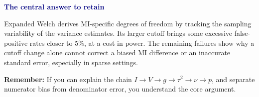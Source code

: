 \documentclass[11pt,a4paper]{article}
\newcommand{\subhead}[1]{\par\medskip\textbf{\textcolor{navy}{#1}}\par\smallskip}
\newcommand{\takeaway}[1]{\par\medskip\noindent\colorbox{pale}{\parbox{\dimexpr\linewidth-2\fboxsep\relax}{\textbf{Remember:} #1}}\par}
\newcommand{\source}[1]{\par\smallskip{\footnotesize\textcolor{navy}{Thesis reference: #1.}}}
\begin{document}
\subhead{The central answer to retain}
Expanded Welch derives MI-specific degrees of freedom by tracking the sampling variability of the variance estimates. Its larger cutoff brings some excessive false-positive rates closer to 5\%, at a cost in power. The remaining failures show why a cutoff change alone cannot correct a biased MI difference or an inaccurate standard error, especially in sparse settings.

\takeaway{If you can explain the chain \(I\rightarrow V\rightarrow g\rightarrow\tau^2\rightarrow\nu\rightarrow p\), and separate numerator bias from denominator error, you understand the core argument.}
\source{Sections 6.4--6.5, Chapter 7 and Appendix B.7}
\end{document}
